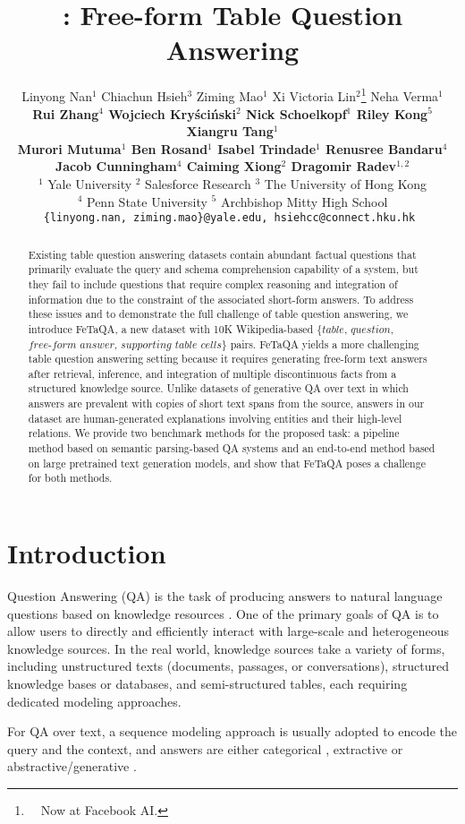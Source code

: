 \documentclass[11pt,a4paper]{article}
\title{\textbf{\ours}: Free-form Table Question Answering}
\author{
        Linyong Nan$^{1}$
\quad   Chiachun Hsieh$^{3}$
\quad   Ziming Mao$^{1}$
\quad   Xi Victoria Lin$^{2}$\thanks{\ \ Now at Facebook AI.}
\quad   Neha Verma$^{1}$
\\{\bf
\quad   Rui Zhang$^{4}$
\quad   Wojciech Kry{\'s}ci{\'n}ski$^{2}$
\quad   Nick Schoelkopf$^{1}$
\quad   Riley Kong$^{5}$
\quad   Xiangru Tang$^{1}$}
\\{\bf
\quad   Murori Mutuma$^{1}$
\quad   Ben Rosand$^{1}$
\quad   Isabel Trindade$^{1}$
\quad   Renusree Bandaru$^{4}$}
\\{\bf
\quad   Jacob Cunningham$^{4}$
\quad   Caiming Xiong$^{2}$
\quad   Dragomir Radev$^{1,2}$}
\\
$^1$ Yale University 
\quad $^2$ Salesforce Research 
\quad $^3$ The University of Hong Kong
\\
\quad $^4$ Penn State University 
\quad $^5$ Archbishop Mitty High School
\\
\tt{\{linyong.nan, ziming.mao\}@yale.edu}, \tt{hsiehcc}@connect.hku.hk
}
\date{}
\newcommand{\ours}{FeTaQA\xspace}
\begin{document}
\maketitle
\begin{abstract}
Existing table question answering datasets contain abundant factual questions that primarily evaluate the query and schema comprehension capability of a system, but they fail to include questions that require complex reasoning and integration of information due to the constraint of the associated short-form answers. To address these issues and to demonstrate the full challenge of table question answering, we introduce \ours, a new dataset with 10K Wikipedia-based $\textit{\{table}$, $\textit{question}$, $\textit{free-form answer}$, $\textit{supporting table cells\}}$ pairs.
\ours yields a more challenging table question answering setting because it requires generating free-form text answers after retrieval, inference, and integration of multiple discontinuous facts from a structured knowledge source. Unlike datasets of generative QA over text in which answers are prevalent with copies of short text spans from the source, answers in our dataset are human-generated explanations involving entities and their high-level relations.
We provide two benchmark methods for the proposed task: a pipeline method based on semantic parsing-based QA systems and an end-to-end method based on large pretrained text generation models, and show that \ours poses a challenge for both methods.
\end{abstract}

\section{Introduction}
Question Answering (QA) is the task of producing answers to natural language questions based on knowledge resources \cite{burke1997question,yao-van-durme-2014-information,chen-etal-2017-reading}.
One of the primary goals of QA is to allow users to directly and efficiently interact with large-scale and heterogeneous knowledge sources.
In the real world, knowledge sources take a variety of forms, including unstructured texts (documents, passages, or conversations), structured knowledge bases or databases, and semi-structured tables, each requiring dedicated modeling approaches.

For QA over text, a sequence modeling approach is usually adopted to encode the query and the context, and answers are either categorical \cite{lai-etal-2017-race}, extractive \cite{rajpurkar-etal-2016-squad, hotpotQA} or abstractive/generative \cite{kocisky-etal-2017-narrativeQA, nguyen-etal-2016-msmarco, fan-etal-2019-ELI5,natural2019kwiatkowski}.
\end{document}
